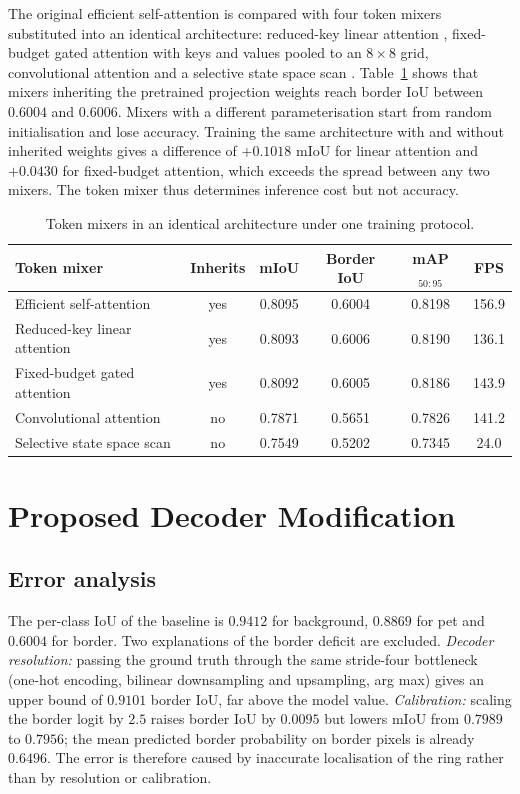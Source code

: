 \documentclass[3p,times,number]{elsarticle}
\begin{document}
The original efficient self-attention \cite{segformer} is compared with four token mixers
substituted into an identical architecture: reduced-key linear attention \cite{flatten},
fixed-budget gated attention with keys and values pooled to an $8 \times 8$ grid,
convolutional attention \cite{segnext} and a selective state space scan \cite{mamba2}. Table~\ref{tab:mixers} shows that mixers
inheriting the pretrained projection weights reach border IoU between $0.6004$ and
$0.6006$. Mixers with a different parameterisation start from random initialisation and
lose accuracy. Training the same architecture with and without inherited weights gives a
difference of $+0.1018$ mIoU for linear attention and $+0.0430$ for fixed-budget
attention, which exceeds the spread between any two mixers. The token mixer thus determines
inference cost but not accuracy.

\begin{table}[t]
\centering
\small
\caption{Token mixers in an identical architecture under one training protocol.}
\label{tab:mixers}
\begin{tabular}{lccccc}
\toprule
\textbf{Token mixer} & \textbf{Inherits} & \textbf{mIoU} & \textbf{Border IoU} &
\textbf{mAP$_{50:95}$} & \textbf{FPS} \\
\midrule
Efficient self-attention        & yes & 0.8095 & 0.6004 & 0.8198 & 156.9 \\
Reduced-key linear attention    & yes & 0.8093 & 0.6006 & 0.8190 & 136.1 \\
Fixed-budget gated attention    & yes & 0.8092 & 0.6005 & 0.8186 & 143.9 \\
\midrule
Convolutional attention         & no  & 0.7871 & 0.5651 & 0.7826 & 141.2 \\
Selective state space scan      & no  & 0.7549 & 0.5202 & 0.7345 & 24.0 \\
\bottomrule
\end{tabular}
\end{table}

\section{Proposed Decoder Modification}

\subsection{Error analysis}

The per-class IoU of the baseline is $0.9412$ for background, $0.8869$ for pet and
$0.6004$ for border. Two explanations of the border deficit are excluded.
\emph{Decoder resolution:} passing the ground truth through the same stride-four bottleneck
(one-hot encoding, bilinear downsampling and upsampling, arg max) gives an upper bound of
$0.9101$ border IoU, far above the model value. \emph{Calibration:} scaling the border
logit by $2.5$ raises border IoU by $0.0095$ but lowers mIoU from $0.7989$ to $0.7956$;
the mean predicted border probability on border pixels is already $0.6496$. The error is
therefore caused by inaccurate localisation of the ring rather than by resolution or
calibration.
\end{document}
